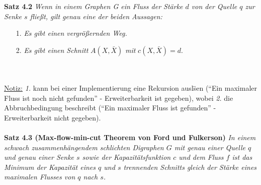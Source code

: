 \documentclass[11pt]{article}
\begin{document}
    \textbf{Satz 4.2} \textit{Wenn in einem Graphen G ein Fluss der St\"arke $d$ von der Quelle $q$ zur Senke $s$ flie\ss{}t, gilt genau eine der beiden Aussagen:}
    \begin{itemize}
        \item[1.] \textit{Es gibt einen vergr\"o\ss{}ernden Weg.}
        \item[2.] \textit{Es gibt einen Schnitt} $A(X,\bar X)$ \textit{mit} $c(X,\bar X) = d$.
    \end{itemize}\\~\\
    \underline{Notiz:} \textit{1.} kann bei einer Implementierung eine Rekursion ausl\"sen ("`Ein maximaler Fluss ist noch nicht gefunden"' - Erweiterbarkeit ist gegeben), wobei \textit{2.} die Abbruchbedingung beschreibt ("`Ein maximaler Fluss ist gefunden"' - Erweiterbarkeit nicht gegeben).\\~\\
    \textbf{Satz 4.3 (Max-flow-min-cut Theorem von Ford und Fulkerson)} \textit{In einem schwach zusammenh\"angendem schlichten Digraphen $G$ mit genau
    einer Quelle $q$ und genau einer Senke $s$ sowie der Kapazit\"atsfunktion $c$ und
    dem Fluss $f$ ist das Minimum der Kapazit\"at eines $q$ und $s$ trennenden Schnitts
    gleich der St\"arke eines maximalen Flusses von $q$ nach $s$.}
\end{document}
